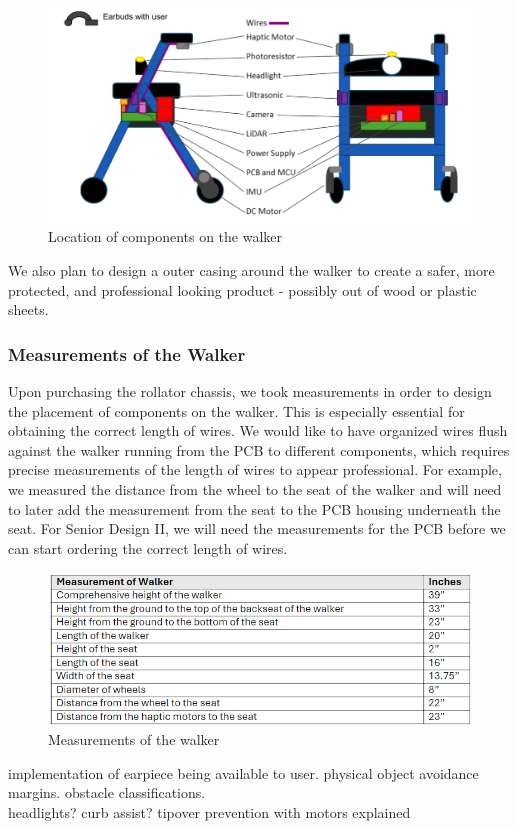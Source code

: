 \begin{figure}[H]
	\centering
	\includegraphics[width=1\textwidth]{./Images/component_location_ear.png}
	\caption{\label{fig:Component-Locations}Location of components on the walker}
\end{figure}


\noindent We also plan to design a outer casing around the walker to create a safer, more protected, and professional looking product - possibly out of wood or plastic sheets. \\

\subsubsection{Measurements of the Walker}
\noindent Upon purchasing the rollator chassis, we took measurements in order to design the placement of components on the walker. This is especially essential for obtaining the correct length of wires. We would like to have organized wires flush against the walker running from the PCB to different components, which requires precise measurements of the length of wires to appear professional. For example, we measured the distance from the wheel to the seat of the walker and will need to later add the measurement from the seat to the PCB housing underneath the seat. For Senior Design II, we will need the measurements for the PCB before we can start ordering the correct length of wires.\\

\begin{figure}[H]
	\centering
	\includegraphics[width=1\textwidth]{./Images/measurements.png}
	\caption{\label{fig:Measurements_of_walker}Measurements of the walker}
\end{figure}

\noindent implementation of earpiece being available to user. physical object avoidance margins. obstacle classifications.\\

\noindent headlights? curb assist? tipover prevention with motors explained\\